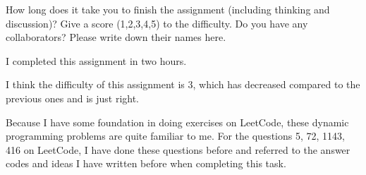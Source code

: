 \documentclass{oxmathproblems}
\begin{document}
\begin{questions}
\begin{parts}
\end{parts}

\miquestion
How long does it take you to finish the assignment (including thinking and discussion)?
Give a score (1,2,3,4,5) to the difficulty.
Do you have any collaborators?
Please write down their names here.
 
I completed this assignment in two hours. 

I think the difficulty of this assignment is 3, which has decreased compared to the previous ones and is just right.

Because I have some foundation in doing exercises on LeetCode, these dynamic programming problems are quite familiar to me. For the questions 5, 72, 1143, 416 on LeetCode, I have done these questions before and referred to the answer codes and ideas I have written before when completing this task.

\end{questions}
\end{document}
